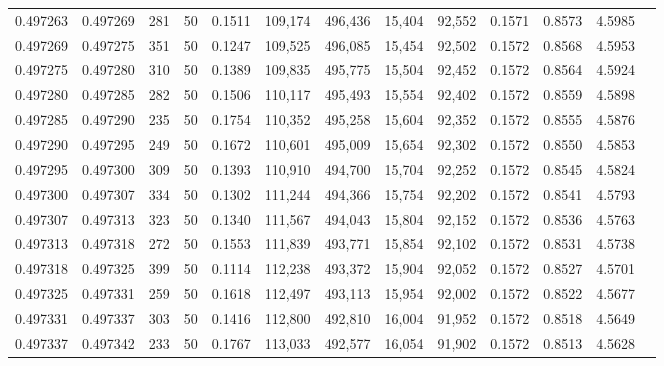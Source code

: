 \begin{tabular}{rrrrrrrrrrrrr}
0.497263 & 0.497269 & 281 &  50 &                                     0.1511 & 109,174 & 496,436 &  15,404 &  92,552 & 0.1571 & 0.8573 & 4.5985 \\
0.497269 & 0.497275 & 351 &  50 &                                     0.1247 & 109,525 & 496,085 &  15,454 &  92,502 & 0.1572 & 0.8568 & 4.5953 \\
0.497275 & 0.497280 & 310 &  50 &                                     0.1389 & 109,835 & 495,775 &  15,504 &  92,452 & 0.1572 & 0.8564 & 4.5924 \\
0.497280 & 0.497285 & 282 &  50 &                                     0.1506 & 110,117 & 495,493 &  15,554 &  92,402 & 0.1572 & 0.8559 & 4.5898 \\
0.497285 & 0.497290 & 235 &  50 &                                     0.1754 & 110,352 & 495,258 &  15,604 &  92,352 & 0.1572 & 0.8555 & 4.5876 \\
0.497290 & 0.497295 & 249 &  50 &                                     0.1672 & 110,601 & 495,009 &  15,654 &  92,302 & 0.1572 & 0.8550 & 4.5853 \\
0.497295 & 0.497300 & 309 &  50 &                                     0.1393 & 110,910 & 494,700 &  15,704 &  92,252 & 0.1572 & 0.8545 & 4.5824 \\
0.497300 & 0.497307 & 334 &  50 &                                     0.1302 & 111,244 & 494,366 &  15,754 &  92,202 & 0.1572 & 0.8541 & 4.5793 \\
0.497307 & 0.497313 & 323 &  50 &                                     0.1340 & 111,567 & 494,043 &  15,804 &  92,152 & 0.1572 & 0.8536 & 4.5763 \\
0.497313 & 0.497318 & 272 &  50 &                                     0.1553 & 111,839 & 493,771 &  15,854 &  92,102 & 0.1572 & 0.8531 & 4.5738 \\
0.497318 & 0.497325 & 399 &  50 &                                     0.1114 & 112,238 & 493,372 &  15,904 &  92,052 & 0.1572 & 0.8527 & 4.5701 \\
0.497325 & 0.497331 & 259 &  50 &                                     0.1618 & 112,497 & 493,113 &  15,954 &  92,002 & 0.1572 & 0.8522 & 4.5677 \\
0.497331 & 0.497337 & 303 &  50 &                                     0.1416 & 112,800 & 492,810 &  16,004 &  91,952 & 0.1572 & 0.8518 & 4.5649 \\
0.497337 & 0.497342 & 233 &  50 &                                     0.1767 & 113,033 & 492,577 &  16,054 &  91,902 & 0.1572 & 0.8513 & 4.5628 \\

\end{tabular}
